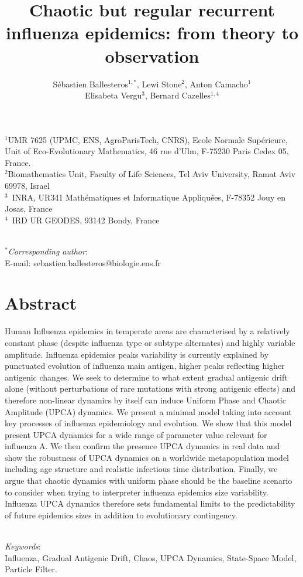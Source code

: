 \documentclass[12pt]{article}
\title{Chaotic but regular recurrent influenza epidemics: from theory
  to observation}
\author{Sébastien Ballesteros$^{1,*}$, Lewi
  Stone$^{2}$,  Anton Camacho$^{1}$\\ Elisabeta Vergu$^{3}$, Bernard Cazelles$^{1,4}$}
\date{}
\begin{document}
\maketitle


$^1$UMR 7625  (UPMC, ENS, AgroParisTech, CNRS), Ecole Normale
Supérieure, Unit of Eco-Evolutionary Mathematics,  46 rue d'Ulm,
F-75230 Paris Cedex 05, France. \\
$^2$Biomathematics Unit, Faculty of Life Sciences, Tel Aviv
University, Ramat Aviv 69978, Israel \\
$^3$~INRA, UR341 Mathématiques et Informatique Appliquées, F-78352 Jouy en Josas, France \\
$^4$~IRD UR GEODES, 93142 Bondy, France

~\\
$^*$\textit{Corresponding author}:  \\
E-mail: sebastien.ballesteros@biologie.ens.fr

\section*{Abstract}


Human Influenza epidemics in temperate areas are characterised by
a relatively constant phase (despite influenza type or subtype
alternates) and highly variable amplitude. Influenza epidemics peaks
variability is currently explained by punctuated evolution of
influenza main antigen, higher peaks reflecting higher antigenic
changes.  We seek to determine to what extent gradual antigenic drift
alone (without perturbations of rare mutations with strong antigenic
effects) and therefore non-linear dynamics by itself can induce
Uniform Phase and Chaotic Amplitude (UPCA) dynamics. We present a
minimal model taking into account key processes of influenza
epidemiology and evolution. We show that this model present UPCA
dynamics for a wide range of parameter value relevant for influenza
A. We then confirm the presence UPCA dynamics in real data and show
the robustness of UPCA dynamics on a worldwide metapopulation model
including age structure and realistic infectious time
distribution. Finally, we argue that chaotic dynamics with uniform
phase should be the baseline scenario to consider when trying to
interpreter influenza epidemics size variability.  Influenza UPCA
dynamics therefore sets fundamental limits to the predictability of
future epidemics sizes in addition to evolutionary contingency.

~ \\
\textit{Keywords}: \\
Influenza, Gradual Antigenic Drift, Chaos, UPCA Dynamics, State-Space
Model, Particle Filter.
\end{document}
